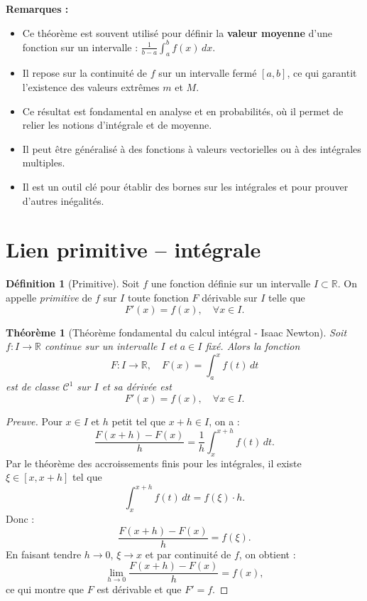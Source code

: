 \documentclass{report} %
\theoremstyle{definition}  %
\newtheorem{definition}{Définition}[chapter] %
\theoremstyle{plain} %
\newtheorem{theorem}{Théorème}[chapter]
\theoremstyle{remark} %
\begin{document}
\medskip

\textbf{Remarques :}
\begin{itemize}
    \item Ce théorème est souvent utilisé pour définir la \textbf{valeur moyenne} d’une fonction sur un intervalle : \(\frac{1}{b - a} \int_a^b f(x) \, dx\).
    \item Il repose sur la continuité de \( f \) sur un intervalle fermé \([a, b]\), ce qui garantit l’existence des valeurs extrêmes \( m \) et \( M \).
    \item Ce résultat est fondamental en analyse et en probabilités, où il permet de relier les notions d’intégrale et de moyenne.
    \item Il peut être généralisé à des fonctions à valeurs vectorielles ou à des intégrales multiples.
    \item Il est un outil clé pour établir des bornes sur les intégrales et pour prouver d’autres inégalités.
\end{itemize}


\medskip


\section{\textbf{Lien primitive – intégrale}}

\begin{definition}[Primitive]
Soit \(f\) une fonction définie sur un intervalle \(I \subset \mathbb{R}\).  
On appelle \emph{primitive} de \(f\) sur \(I\) toute fonction \(F\) dérivable sur \(I\) telle que
\[
F'(x) = f(x), \quad \forall x \in I.
\]
\end{definition}
\medskip
\begin{theorem}[Théorème fondamental du calcul intégral - Isaac Newton]
Soit \(f : I \to \mathbb{R}\) continue sur un intervalle \(I\) et \(a \in I\) fixé.  
Alors la fonction
\[
F : I \to \mathbb{R}, \quad F(x) = \int_a^x f(t)\, dt
\]
est de classe \(\mathcal{C}^1\) sur \(I\) et sa dérivée est
\[
F'(x) = f(x), \quad \forall x \in I.
\]
\end{theorem}
\medskip
\begin{proof}[Preuve]
Pour \(x \in I\) et \(h\) petit tel que \(x+h \in I\), on a :
\[
\frac{F(x+h) - F(x)}{h} = \frac{1}{h} \int_x^{x+h} f(t)\, dt.
\]
Par le théorème des accroissements finis pour les intégrales, il existe \(\xi \in [x, x+h]\) tel que
\[
\int_x^{x+h} f(t)\, dt = f(\xi) \cdot h.
\]
Donc :
\[
\frac{F(x+h) - F(x)}{h} = f(\xi).
\]
En faisant tendre \(h \to 0\), \(\xi \to x\) et par continuité de \(f\), on obtient :
\[
\lim_{h \to 0} \frac{F(x+h) - F(x)}{h} = f(x),
\]
ce qui montre que \(F\) est dérivable et que \(F' = f\).
\end{proof}
\medskip
\end{document}
